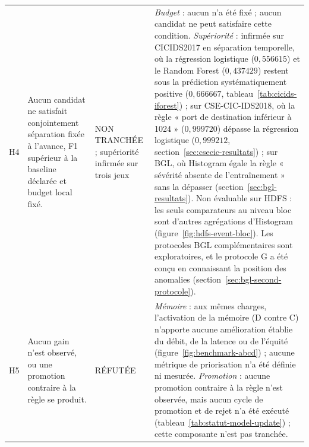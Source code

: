 \begin{table}[H]
\begin{tabularx}{\textwidth}{p{} p{} p{} X}
H4 & Aucun candidat ne satisfait conjointement séparation fixée à l'avance, F1 supérieur à la baseline déclarée et budget local fixé. &
NON TRANCHÉE ; supériorité infirmée sur trois jeux &
\textit{Budget} : aucun n'a été fixé ; aucun candidat ne peut satisfaire cette condition. \textit{Supériorité} : infirmée sur CICIDS2017 en séparation temporelle, où la régression logistique ($0{,}556615$) et le Random Forest ($0{,}437429$) restent sous la prédiction systématiquement positive ($0{,}666667$, tableau~\ref{tab:cicids-iforest}) ; sur CSE-CIC-IDS2018, où la règle « port de destination inférieur à 1024 » ($0{,}999720$) dépasse la régression logistique ($0{,}999212$, section~\ref{sec:csecic-resultats}) ; sur BGL, où Histogram égale la règle « sévérité absente de l'entraînement » sans la dépasser (section~\ref{sec:bgl-resultats}). Non évaluable sur HDFS : les seuls comparateurs au niveau bloc sont d'autres agrégations d'Histogram (figure~\ref{fig:hdfs-event-bloc}). Les protocoles BGL complémentaires sont exploratoires, et le protocole G a été conçu en connaissant la position des anomalies (section~\ref{sec:bgl-second-protocole}). \\

H5 & Aucun gain n'est observé, ou une promotion contraire à la règle se produit. &
RÉFUTÉE &
\textit{Mémoire} : aux mêmes charges, l'activation de la mémoire (D contre C) n'apporte aucune amélioration établie du débit, de la latence ou de l'équité (figure~\ref{fig:benchmark-abcd}) ; aucune métrique de priorisation n'a été définie ni mesurée. \textit{Promotion} : aucune promotion contraire à la règle n'est observée, mais aucun cycle de promotion et de rejet n'a été exécuté (tableau~\ref{tab:statut-model-update}) ; cette composante n'est pas tranchée. \\

\bottomrule

\end{tabularx}

\end{table}

